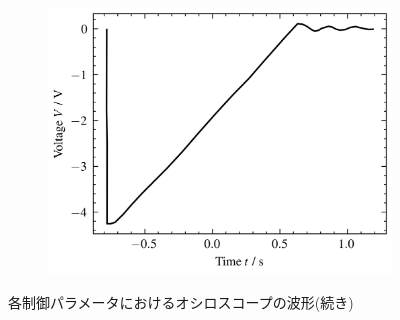 \begin{figure}
\begin{subfigure}{0.48\columnwidth}
		\label{fig:oscilloscope-each-p100-d80}
	\end{subfigure}
	\begin{subfigure}{0.48\columnwidth}
		\centering
		\includegraphics[width=0.8\linewidth]{src/figures/oscilloscope-each/p100-d100-oscilloscope.csv.png}
		\label{fig:oscilloscope-each-p100-d100}
	\end{subfigure}

	\caption{各制御パラメータにおけるオシロスコープの波形(続き)}\label{fig:oscilloscope-each}
\end{figure}
